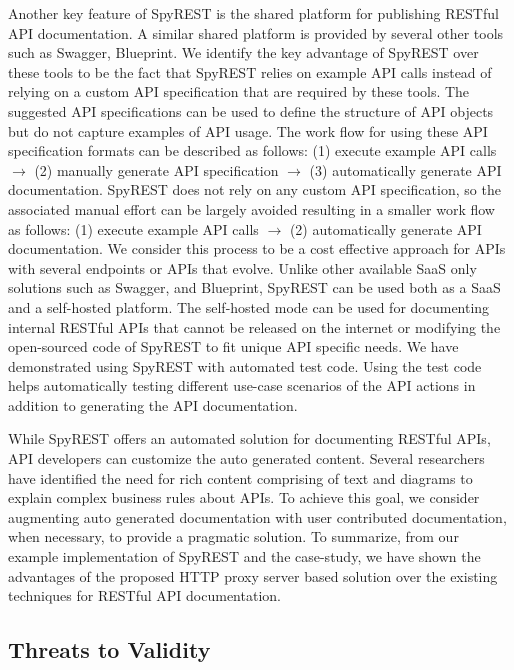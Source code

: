 Another key feature of SpyREST is the shared platform for publishing RESTful API documentation. A similar shared platform is provided by several other tools such as Swagger, Blueprint. We identify the key advantage of SpyREST over these tools to be the fact that SpyREST relies on example API calls instead of relying on a custom API specification that are required by these tools. The suggested API specifications can be used to define the structure of API objects but do not capture examples of API usage. The work flow for using these API specification formats can be described as follows: (1) execute example API calls $\longrightarrow$ (2) manually generate API specification $\longrightarrow$ (3) automatically generate API documentation. SpyREST does not rely on any custom API specification, so the associated manual effort can be largely avoided resulting in a smaller work flow as follows: (1) execute example API calls $\longrightarrow$ (2) automatically generate API documentation. We consider this process to be a cost effective approach for APIs with several endpoints or APIs that evolve. Unlike other available SaaS only solutions such as Swagger, and Blueprint, SpyREST can be used both as a SaaS and a self-hosted platform. The self-hosted mode can be used for documenting internal RESTful APIs that cannot be released on the internet or modifying the open-sourced code of SpyREST to fit unique API specific needs. We have demonstrated using SpyREST with automated test code. Using the test code helps automatically testing different use-case scenarios of the API actions in addition to generating the API documentation.

While SpyREST offers an automated solution for documenting RESTful APIs, API developers can customize the auto generated content. Several researchers have identified the need for rich content comprising of text and diagrams to explain complex business rules about APIs. To achieve this goal, we consider augmenting auto generated documentation with user contributed documentation, when necessary, to provide a pragmatic solution. To summarize, from our example implementation of SpyREST and the case-study, we have shown the advantages of the proposed HTTP proxy server based solution over the existing techniques for RESTful API documentation.

\subsection{Threats to Validity} %
\label{sub:threats_to_validity}

